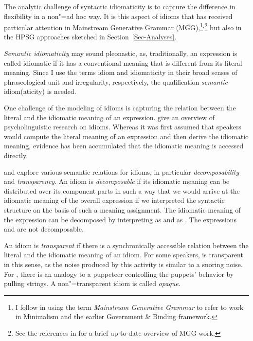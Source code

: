 \documentclass[output=paper,biblatex,babelshorthands,newtxmath,draftmode,colorlinks,citecolor=brown]{langscibook}
\begin{document}
The analytic challenge of syntactic idiomaticity is to capture the difference in flexibility in a
non"=ad hoc way. It is this aspect of idioms that has received particular attention in Mainstream
Generative Grammar (MGG),\footnote{%
  I follow \citet[]{CJ2005a} in using the term \emph{Mainstream Generative Grammar} to
  refer to work in Minimalism and the earlier Government \& Binding framework.}$^,$\footnote{See the
  references in \citet{Corver:al:19} for a brief up-to-date overview of MGG work.}
but also in the HPSG approaches sketched in Section~\ref{Sec-Analyses}.

\emph{Semantic idiomaticity} may sound pleonastic, as, traditionally, an expression is called idiomatic if it has a conventional meaning that is different from its literal meaning. 
Since I use the terms idiom and idiomaticity in their broad senses of phraseological unit and irregularity, respectively, the qualification \emph{semantic} idiom(aticity) is needed. 

One challenge of the modeling of idioms is capturing the relation between the literal and the idiomatic meaning of an expression.
\citet{Gibbs:Colston:07} give an overview of 
psycholinguistic research on idioms. Whereas it was first assumed that speakers would compute the literal meaning of an expression and then derive the idiomatic meaning, evidence has been accumulated that the idiomatic meaning is accessed directly.

\citet*{WSN84a-u} and \citet*{NSW94a} explore various semantic relations for idioms, in particular \emph{decomposability} and \emph{transparency}.
An idiom is \emph{decomposable} if its idiomatic meaning can be distributed over its component parts in such a way that we would arrive at the idiomatic meaning of the overall expression if we interpreted the syntactic structure on the basis of such a meaning assignment. 
The idiomatic meaning of the expression  can be decomposed by interpreting  as  and  as . 
The expressions  and  are not decomposable.

\largerpage
An idiom is \emph{transparent} if there is a synchronically accessible relation between the literal
and the idiomatic meaning of an idiom.  For some speakers,  is transparent in this
sense, as the noise produced by this activity is similar to a snoring noise.  For , there is an analogy to a puppeteer controlling the puppets' behavior by pulling
strings. A non"=transparent idiom is called \emph{opaque}.
\end{document}
